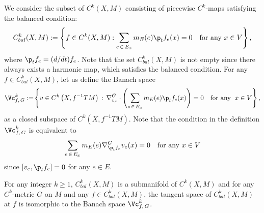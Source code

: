 We consider the subset of $C^k(X, M)$ consisting of piecewise $C^k$-maps satisfying the balanced condition:
\[
C^k_{bal}(X,M):=\left\{f\in C^k(X,M): \sum_{e\,\in\,E_x}m_E(e)\p_t f_e (x)=0 \quad \text{for any }x\in V\right\},
\]
where $\p_t f_e=(d/dt)f_e$. Note that the set $C^k_{bal}(X,M)$ is not empty since there always exists a harmonic map, which satisfies the balanced condition. For any $f \in C^k_{bal}(X,M)$, let us define the Banach space
\[
\Vc_{f,\,G}^k:=\!\left\{v\in C^k\left(X, f^{-1}TM\right)\,:\, \nabla^G_{v_x}\cdot \left(\sum_{e\,\in\,E_{x}}m_E(e) \p_t{f}_e(x)\right)=0 \quad \text{for any }\;x\in V\right\},
\]
as a closed subspace of $C^k(X, f^{-1}TM)$. Note that the condition in the definition $\Vc_{f,\,G}^k$ is equivalent to
\[
\sum_{e\,\in\,E_{x}}m_E(e) \nabla^G_{\p_t{f}_e}v_e(x)=0 \quad \text{for any }x\in V
\]
since $[v_e, \p_t{f}_e]=0$ for any $e \in E$.


\begin{lemm}
For any integer $k \ge 1$, $C^k_{bal}(X,M)$ is a submanifold of $C^k(X,M)$ and for any $C^k$-metric $G$ on $M$ and any $f \in C^k_{bal}(X,M)$, the tangent space of $C^k_{bal}(X,M)$ at $f$ is isomorphic to the Banach space $\Vc_{f,\,G}^k$.
\end{lemm}


